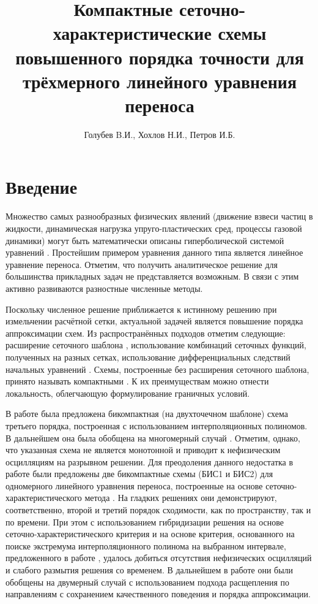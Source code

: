 \documentclass[11pt]{article}
\title{Компактные сеточно-характеристические схемы повышенного порядка точности для трёхмерного линейного уравнения переноса}
\date{}
\author{Голубев B.И., Хохлов Н.И., Петров И.Б.}
\begin{document}
\maketitle

\section{Введение}

Множество самых разнообразных физических явлений (движение взвеси частиц в жидкости, динамическая нагрузка упруго-пластических сред, процессы газовой динамики) могут быть математически описаны гиперболической системой уравнений \cite{Kholodov2008}.
Простейшим примером уравнения данного типа является линейное уравнение переноса.
Отметим, что получить аналитическое решение для большинства прикладных задач не представляется возможным.
В связи с этим активно развиваются разностные численные методы.

Поскольку численное решение приближается к истинному решению при измельчении расчётной сетки, актуальной задачей является повышение порядка аппроксимации схем.
Из распространённых подходов отметим следующие: расширение сеточного шаблона \cite{Rusanov1961}, использование комбинаций сеточных функций, полученных на разных сетках,
использование дифференциальных следствий начальных уравнений \cite{Khol2006}.
Схемы, построенные без расширения сеточного шаблона, принято называть компактными \cite{Tolstih1990}.
К их преимуществам можно отнести локальность, облегчающую формулирование граничных условий.

В работе \cite{Yabe1991} была предложена бикомпактная (на двухточечном шаблоне) схема третьего порядка, построенная с использованием интерполяционных полиномов.
В дальнейшем она была обобщена на многомерный случай \cite{Yabe2004}.
Отметим, однако, что указанная схема не является монотонной и приводит к нефизическим осцилляциям на разрывном решении.
Для преодоления данного недостатка в работе \cite{Khokhlov1D2014} были предложены две бикомпактные схемы (БИС1 и БИС2) для одномерного
линейного уравнения переноса, построенные на основе сеточно-характеристического метода \cite{Magometov-Kholodov-1969}.
На гладких решениях они демонстрируют, соответственно, второй и третий порядок сходимости, как по пространству, так и по времени.
При этом с использованием гибридизации решения \cite{petrov1984} на основе сеточно-характеристического критерия \cite{van1979} и на основе критерия,
основанного на поиске экстремума интерполяционного полинома на выбранном интервале, предложенного в работе \cite{Khokhlov1D2014},
удалось добиться отсутствия нефизических осцилляций и слабого размытия решения со временем.
В дальнейшем в работе \cite{Golubev2D2014} они были обобщены на двумерный случай с использованием подхода расщепления по направлениям с сохранением качественного поведения и порядка аппроксимации.
\end{document}
